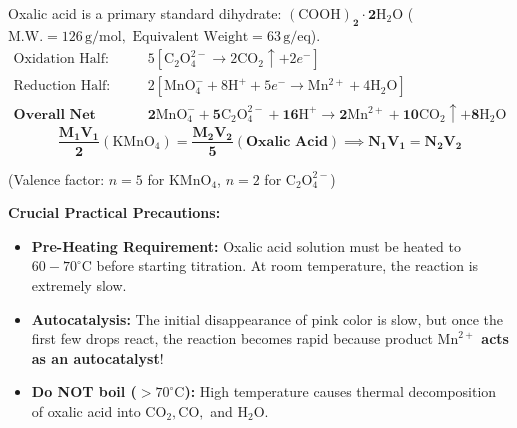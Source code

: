 \documentclass[10pt,a4paper]{article}
\begin{document}
\begin{formulabox}
Oxalic acid is a primary standard dihydrate: $\mathbf{(\mathrm{COOH})_2\cdot 2\mathrm{H_2O}}$ ($\mathrm{M.W.} = 126\,\mathrm{g/mol}, \text{ Equivalent Weight} = 63\,\mathrm{g/eq}$).
\begin{align*}
  \text{Oxidation Half: } & 5[\mathrm{C_2O_4^{2-}} \longrightarrow 2\mathrm{CO_2} \uparrow + 2e^-]\\
  \text{Reduction Half: } & 2[\mathrm{MnO_4^-} + 8\mathrm{H}^+ + 5e^- \longrightarrow \mathrm{Mn^{2+}} + 4\mathrm{H_2O}]\\
  \textbf{Overall Net Redox: } & \mathbf{2\mathrm{MnO_4^-} + 5\mathrm{C_2O_4^{2-}} + 16\mathrm{H}^+ \longrightarrow 2\mathrm{Mn^{2+}} + 10\mathrm{CO_2} \uparrow + 8\mathrm{H_2O}}
\end{align*}
\begin{equation}
  \mathbf{\frac{M_1 V_1}{2} (\mathrm{KMnO_4}) = \frac{M_2 V_2}{5} (\text{Oxalic Acid})} \implies \mathbf{N_1 V_1 = N_2 V_2}
\end{equation}
\centerline{\small (Valence factor: $n = 5$ for $\mathrm{KMnO_4}$, $n = 2$ for $\mathrm{C_2O_4^{2-}}$)}
\textbf{Crucial Practical Precautions:}
\begin{itemize}
  \item \textbf{Pre-Heating Requirement:} Oxalic acid solution must be heated to \textbf{$60-70^\circ\mathrm{C}$} before starting titration. At room temperature, the reaction is extremely slow.
  \item \textbf{Autocatalysis:} The initial disappearance of pink color is slow, but once the first few drops react, the reaction becomes rapid because product \textbf{$\mathrm{Mn}^{2+}$ acts as an autocatalyst}!
  \item \textbf{Do NOT boil ($>70^\circ\mathrm{C}$):} High temperature causes thermal decomposition of oxalic acid into $\mathrm{CO}_2, \mathrm{CO},$ and $\mathrm{H}_2\mathrm{O}$.
\end{itemize}
\end{formulabox}
\end{document}
